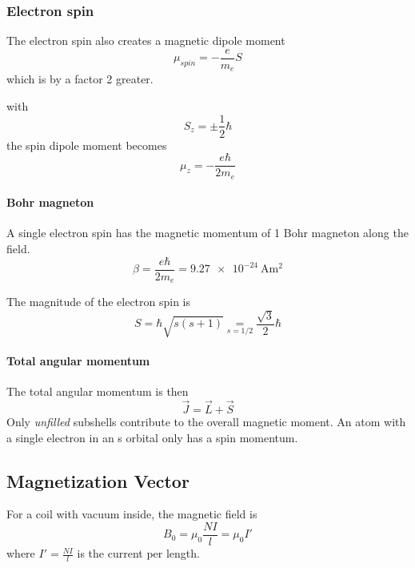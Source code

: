 \subsubsection{Electron spin}
The electron spin also creates a magnetic dipole moment
\begin{equation}
    \mu_{spin} = -\frac{e}{m_e}S
\end{equation}
which is by a factor 2 greater.

with 
\begin{equation}
S_z = \pm \frac{1}{2} \hbar
\end{equation}
the spin dipole moment becomes
\begin{equation}
    \mu_z = -\frac{e \hbar}{2 m_e}
\end{equation}

\paragraph{Bohr magneton}
A single electron spin has the magnetic momentum of 1 Bohr magneton along the field.
\begin{equation}
    \beta = \frac{e \hbar}{2 m_e} = \SI{9.27e-24}{\ampere\square\meter}
\end{equation}

The magnitude of the electron spin is 
\begin{equation}
    S = \hbar \sqrt{s (s+1)} \underset{s=1/2}{=} \frac{\sqrt{3}}{2} \hbar
\end{equation}

\paragraph{Total angular momentum}
The total angular momentum is then
\begin{equation}
    \vec{J} = \vec{L} + \vec{S}
\end{equation}
Only \emph{unfilled} subshells contribute to the overall magnetic moment.
An atom with a single electron in an s orbital only has a spin momentum.

\subsection{Magnetization Vector}
For a coil with vacuum inside, the magnetic field is
\begin{equation}
    B_0 = \mu_0 \frac{N I}{l} = \mu_0 I'
\end{equation}
where $I' = \frac{NI}{l}$ is the current per length.

